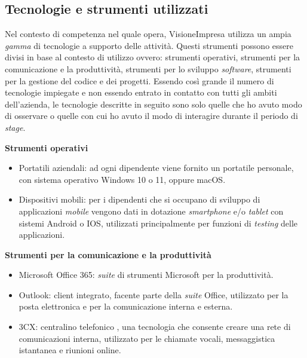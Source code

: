 \subsection{Tecnologie e strumenti utilizzati}
Nel contesto di competenza nel quale opera, VisioneImpresa utilizza un ampia \textit{gamma} di tecnologie a supporto delle attività. Questi strumenti possono essere divisi in base al contesto di utilizzo ovvero: strumenti operativi, strumenti per la comunicazione e la produttività, strumenti per lo sviluppo \textit{software}, strumenti per la gestione del codice e dei progetti.
Essendo così grande il numero di tecnologie impiegate e non essendo entrato in contatto con tutti gli ambiti dell'azienda, le tecnologie descritte in seguito sono solo quelle che ho avuto modo di osservare o quelle con cui ho avuto il modo di interagire durante il periodo di \textit{stage}.

\textbf{Strumenti operativi}
\begin{itemize}
  \item Portatili aziendali: ad ogni dipendente viene fornito un portatile personale, con sistema operativo Windows 10 o 11, oppure macOS. 
  \item Dispositivi mobili: per i dipendenti che si occupano di sviluppo di applicazioni \textit{mobile} vengono dati in dotazione \textit{smartphone} e/o \textit{tablet} con sistemi Android o IOS, utilizzati principalmente per funzioni di \textit{testing} delle applicazioni.
\end{itemize}

\textbf{Strumenti per la comunicazione e la produttività}
\begin{itemize}
  \item Microsoft Office 365: \textit{suite} di strumenti Microsoft per la produttività.
  \item Outlook: client integrato, facente parte della \textit{suite} Office, utilizzato per la posta elettronica e per la comunicazione interna e esterna.
  \item 3CX: centralino telefonico , una tecnologia che consente creare una rete di comunicazioni interna, utilizzato per le chiamate vocali, messaggistica istantanea e riunioni online. 
\end{itemize}

